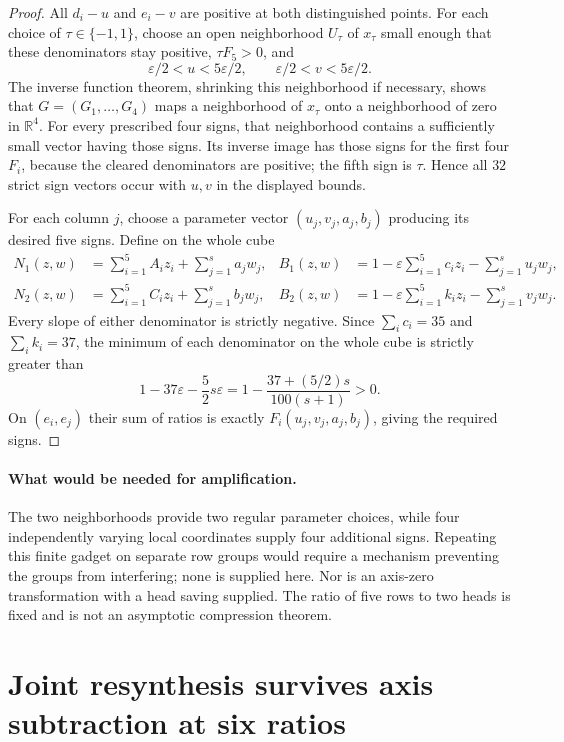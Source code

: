 \documentclass[11pt]{article}
\begin{document}
\begin{proof}
All $d_i-u$ and $e_i-v$ are positive at both distinguished points.
For each choice of $\tau\in\{-1,1\}$, choose an open neighborhood
$U_\tau$ of $x_\tau$ small enough that these denominators stay positive,
$\tau F_5>0$, and
\[
 \varepsilon/2<u<5\varepsilon/2,\qquad
 \varepsilon/2<v<5\varepsilon/2.
\]
The inverse function theorem, shrinking this neighborhood if necessary,
shows that $G=(G_1,\ldots,G_4)$ maps a neighborhood of $x_\tau$
onto a neighborhood of zero in $\mathbb R^4$. For every prescribed
four signs, that neighborhood contains a sufficiently small vector
having those signs. Its inverse image has those signs for the first
four $F_i$, because the cleared denominators are positive; the fifth
sign is $\tau$. Hence all $32$ strict sign vectors occur with $u,v$
in the displayed bounds.

For each column $j$, choose a parameter vector
$(u_j,v_j,a_j,b_j)$ producing its desired five signs. Define on the
whole cube
\[
\begin{split}
 N_1(z,w)&=\sum_{i=1}^5 A_i z_i+\sum_{j=1}^s a_jw_j,
 &B_1(z,w)&=1-\varepsilon\sum_{i=1}^5c_i z_i-\sum_{j=1}^su_jw_j,\\
 N_2(z,w)&=\sum_{i=1}^5 C_i z_i+\sum_{j=1}^s b_jw_j,
 &B_2(z,w)&=1-\varepsilon\sum_{i=1}^5k_i z_i-\sum_{j=1}^sv_jw_j.
\end{split}
\]
Every slope of either denominator is strictly negative. Since
$\sum_i c_i=35$ and $\sum_i k_i=37$, the minimum of each denominator
on the whole cube is strictly greater than
\[
 1-37\varepsilon-\frac52s\varepsilon
 =1-\frac{37+(5/2)s}{100(s+1)}>0.
\]
On $(e_i,e_j)$ their sum of ratios is exactly
$F_i(u_j,v_j,a_j,b_j)$, giving the required signs.
\end{proof}

\paragraph{What would be needed for amplification.}
The two neighborhoods provide two regular parameter choices, while four
independently varying local coordinates supply four additional signs.
Repeating this finite gadget on separate row groups would require a
mechanism preventing the groups from interfering; none is supplied here.
Nor is an axis-zero transformation with a head saving supplied. The
ratio of five rows to two heads is fixed and is not an asymptotic
compression theorem.

\section{Joint resynthesis survives axis subtraction at six ratios}
\end{document}
